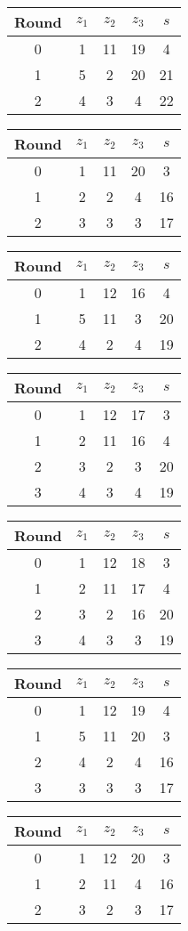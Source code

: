 \begin{tabular}{c | c | c | c | c }
Round & $z_1$ & $z_2$ & $z_3$ & $s$ \\
\hline
0 & 1 & 11 & 19 & 4 \\
1 & 5 & 2 & 20 & 21 \\
2 & 4 & 3 & 4 & 22
\end{tabular}

\begin{tabular}{c | c | c | c | c }
Round & $z_1$ & $z_2$ & $z_3$ & $s$ \\
\hline
0 & 1 & 11 & 20 & 3 \\
1 & 2 & 2 & 4 & 16 \\
2 & 3 & 3 & 3 & 17
\end{tabular}

\begin{tabular}{c | c | c | c | c }
Round & $z_1$ & $z_2$ & $z_3$ & $s$ \\
\hline
0 & 1 & 12 & 16 & 4 \\
1 & 5 & 11 & 3 & 20 \\
2 & 4 & 2 & 4 & 19
\end{tabular}

\begin{tabular}{c | c | c | c | c }
Round & $z_1$ & $z_2$ & $z_3$ & $s$ \\
\hline
0 & 1 & 12 & 17 & 3 \\
1 & 2 & 11 & 16 & 4 \\
2 & 3 & 2 & 3 & 20 \\
3 & 4 & 3 & 4 & 19
\end{tabular}

\begin{tabular}{c | c | c | c | c }
Round & $z_1$ & $z_2$ & $z_3$ & $s$ \\
\hline
0 & 1 & 12 & 18 & 3 \\
1 & 2 & 11 & 17 & 4 \\
2 & 3 & 2 & 16 & 20 \\
3 & 4 & 3 & 3 & 19
\end{tabular}

\begin{tabular}{c | c | c | c | c }
Round & $z_1$ & $z_2$ & $z_3$ & $s$ \\
\hline
0 & 1 & 12 & 19 & 4 \\
1 & 5 & 11 & 20 & 3 \\
2 & 4 & 2 & 4 & 16 \\
3 & 3 & 3 & 3 & 17
\end{tabular}

\begin{tabular}{c | c | c | c | c }
Round & $z_1$ & $z_2$ & $z_3$ & $s$ \\
\hline
0 & 1 & 12 & 20 & 3 \\
1 & 2 & 11 & 4 & 16 \\
2 & 3 & 2 & 3 & 17
\end{tabular}

